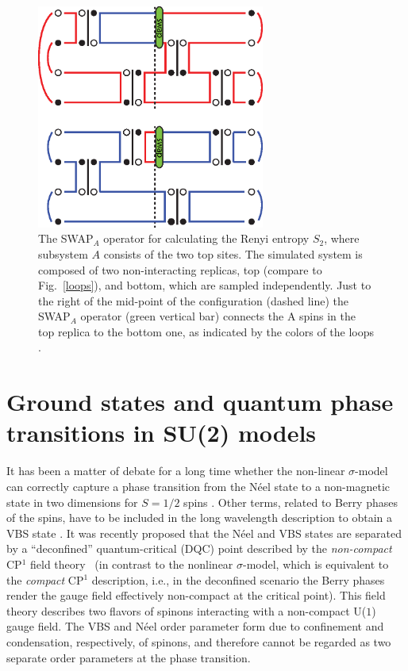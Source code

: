\documentclass[10pt,pre,aps,twocolumn,showpacs,subscriptaddresses,floatfix]{revtex4}
\begin{document}
\begin{figure}
\includegraphics[width=7.5cm, clip]{fig02.eps}
\caption{The {\rm SWAP}$_A$ operator for calculating the Renyi entropy $S_2$, where subsystem $A$ consists of the two top sites. The simulated system is 
composed of two non-interacting replicas, top (compare to Fig.~\ref{loops}), and bottom, which are sampled independently. Just to the right of the mid-point 
of the configuration (dashed line) the {\rm SWAP}$_A$ operator (green vertical bar) connects the A spins in the top replica to the bottom one, as indicated by 
the colors of the loops \cite{Kallin11}.}
\label{swap}
\end{figure}

\section{Ground states and quantum phase transitions in SU(2) models}
\label{sec:su2models}

It has been a matter of debate for a long time whether the non-linear $\sigma$-model can correctly capture a phase transition from the N\'eel state 
to a non-magnetic state in two dimensions for $S=1/2$ spins \cite{Chakravarty89}. Other terms, related to Berry phases of the spins, have to be included in the long wavelength description to obtain a VBS state \cite{Read90,murthy1990:mono}. It was recently proposed that the N\'eel and VBS states are separated
by a ``deconfined'' quantum-critical (DQC) point \cite{Senthil04a} described by the {\it non-compact} CP$^1$ field theory~\cite{Motrunich04} (in contrast to the nonlinear 
$\sigma$-model, which is equivalent to the {\it compact} CP$^1$ description, i.e., in the deconfined scenario the Berry phases render the gauge field effectively
non-compact at the critical point).
This field theory describes two flavors of spinons interacting with a non-compact U($1$) gauge field.  The VBS and N\'eel order parameter form due to confinement and condensation, 
respectively, of spinons, and therefore cannot be regarded as two separate order parameters at the phase transition.
\end{document}
